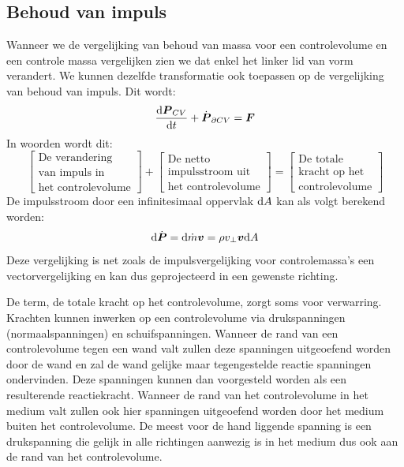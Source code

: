 			\subsection{Behoud van impuls}
			\label{sec:Behoud van impuls}
Wanneer we de vergelijking van behoud van massa voor een controlevolume en een controle massa vergelijken zien we dat enkel het linker lid van vorm verandert. We kunnen dezelfde transformatie ook toepassen op de vergelijking van behoud van impuls. Dit wordt:
\begin{equation}
	\frac{\mathrm{d} \boldsymbol{P}_{CV}}{\mathrm{d} t} + \dot{\boldsymbol{P}}_{\partial CV} =  \boldsymbol{F}
	\label{eqn:controlevolume,behoud van impuls}
\end{equation}
In woorden wordt dit:
\begin{equation}
	\left[
		\begin{array}{c}
			\mbox{De verandering} \\ \mbox{van impuls in} \\ \mbox{het controlevolume}
		\end{array}
	\right]
	+
	\left[
		\begin{array}{c}
			\mbox{De netto} \\ \mbox{impulsstroom uit} \\ \mbox{het controlevolume}
		\end{array}
	\right]
	=
	\left[
		\begin{array}{c}
			\mbox{De totale} \\ \mbox{kracht op het} \\ \mbox{controlevolume}
		\end{array}
	\right]
	\label{eqn:controlevolume,behoud van impuls,woorden}
\end{equation}
De impulsstroom door een infinitesimaal oppervlak $\mathrm{d} A$ kan als volgt berekend worden:
\begin{equation}
	\mathrm{d} \dot{\boldsymbol{P}} =  \mathrm{d} \dot{m} \boldsymbol{v} = \rho v_{\perp} \boldsymbol{v} \mathrm{d} A
	\label{eqn:impulsstroom}
\end{equation}
Deze vergelijking is net zoals de impulsvergelijking voor controlemassa's een vectorvergelijking en kan dus geprojecteerd in een gewenste richting.

De term, de totale kracht op het controlevolume, zorgt soms voor verwarring. Krachten kunnen inwerken op een controlevolume via drukspanningen (normaalspanningen) en schuifspanningen. Wanneer de rand van een controlevolume tegen een wand valt zullen deze spanningen uitgeoefend worden door de wand en zal de wand gelijke maar tegengestelde reactie spanningen ondervinden. Deze spanningen kunnen dan voorgesteld worden als een resulterende reactiekracht. Wanneer de rand van het controlevolume in het medium valt zullen ook hier spanningen uitgeoefend worden door het medium buiten het controlevolume. De meest voor de hand liggende spanning is een drukspanning die gelijk in alle richtingen aanwezig is in het medium dus ook aan de rand van het controlevolume.

